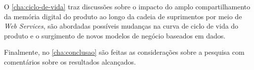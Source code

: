 O \autoref{cha:ciclo-de-vida} traz discussões sobre o impacto do amplo compartilhamento da memória digital do produto ao longo da cadeia de suprimentos por meio de \textit{Web Services}, são abordadas possíveis mudanças na curva de ciclo de vida do produto e o surgimento de novos modelos de negócio baseados em dados.




Finalmente, no \autoref{cha:conclusao} são feitas as considerações sobre a pesquisa com comentários sobre os resultados alcançados.
